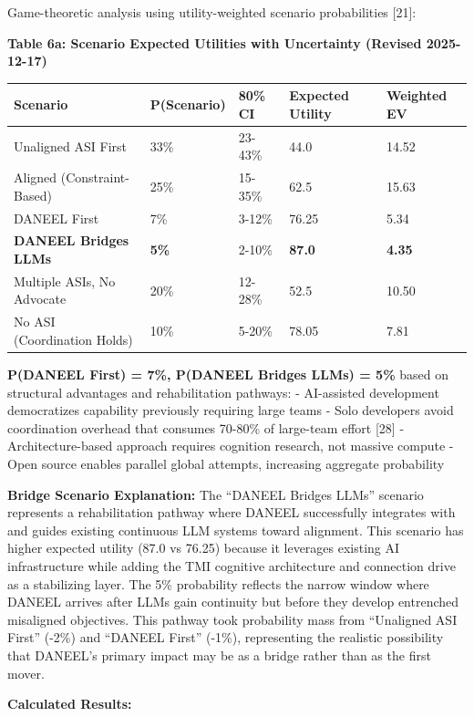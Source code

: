 \documentclass[
]{article}
\begin{document}
Game-theoretic analysis using utility-weighted scenario probabilities
{[}21{]}:

\textbf{Table 6a: Scenario Expected Utilities with Uncertainty (Revised
2025-12-17)}

\begin{longtable}[]{@{}lllll@{}}
\toprule\noalign{}
Scenario & P(Scenario) & 80\% CI & Expected Utility & Weighted EV \\
\midrule\noalign{}
\endhead
\bottomrule\noalign{}
\endlastfoot
Unaligned ASI First & 33\% & 23-43\% & 44.0 & 14.52 \\
Aligned (Constraint-Based) & 25\% & 15-35\% & 62.5 & 15.63 \\
DANEEL First & 7\% & 3-12\% & 76.25 & 5.34 \\
\textbf{DANEEL Bridges LLMs} & \textbf{5\%} & 2-10\% & \textbf{87.0} &
\textbf{4.35} \\
Multiple ASIs, No Advocate & 20\% & 12-28\% & 52.5 & 10.50 \\
No ASI (Coordination Holds) & 10\% & 5-20\% & 78.05 & 7.81 \\
\end{longtable}

\textbf{P(DANEEL First) = 7\%, P(DANEEL Bridges LLMs) = 5\%} based on
structural advantages and rehabilitation pathways: - AI-assisted
development democratizes capability previously requiring large teams -
Solo developers avoid coordination overhead that consumes 70-80\% of
large-team effort {[}28{]} - Architecture-based approach requires
cognition research, not massive compute - Open source enables parallel
global attempts, increasing aggregate probability

\textbf{Bridge Scenario Explanation:} The ``DANEEL Bridges LLMs''
scenario represents a rehabilitation pathway where DANEEL successfully
integrates with and guides existing continuous LLM systems toward
alignment. This scenario has higher expected utility (87.0 vs 76.25)
because it leverages existing AI infrastructure while adding the TMI
cognitive architecture and connection drive as a stabilizing layer. The
5\% probability reflects the narrow window where DANEEL arrives after
LLMs gain continuity but before they develop entrenched misaligned
objectives. This pathway took probability mass from ``Unaligned ASI
First'' (-2\%) and ``DANEEL First'' (-1\%), representing the realistic
possibility that DANEEL's primary impact may be as a bridge rather than
as the first mover.

\textbf{Calculated Results:}
\end{document}
